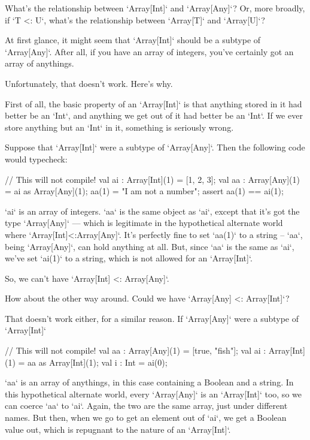 What's the relationship between \xcd`Array[Int]` and \xcd`Array[Any]`?  Or,
more broadly, if \xcd`T <: U`, what's the relationship between \xcd`Array[T]`
and \xcd`Array[U]`?

At first glance, it might seem that \xcd`Array[Int]` should be a subtype of
\xcd`Array[Any]`.  After all, if you have an array of integers, you've
certainly got an array of anythings. 

Unfortunately, that doesn't work.  Here's why. 

First of all, the basic property of an \xcd`Array[Int]` is that anything
stored in it had better be an \xcd`Int`, and anything we get out of it had
better be an \xcd`Int`.  If we ever store anything but an
\xcd`Int` in it, something is seriously wrong.  

Suppose that \xcd`Array[Int]` were a subtype of \xcd`Array[Any]`.  Then the
following code would typecheck:
\begin{xten}
// This will not compile!
val ai : Array[Int](1) = [1, 2, 3];
val aa : Array[Any](1) = ai as Array[Any](1);
aa(1) = "I am not a number";
assert aa(1) == ai(1);
\end{xten}
\xcd`ai` is an array of integers.  \xcd`aa` is the same object as \xcd`ai`,
except that it's got the type \xcd`Array[Any]` --- which is legitimate in the
hypothetical alternate world where \xcd`Array[Int]<:Array[Any]`.  
It's perfectly fine to set \xcd`aa(1)` to a string -- \xcd`aa`, being
\xcd`Array[Any]`, can hold anything at all.  But, since \xcd`aa` is the same
as \xcd`ai`, we've set \xcd`ai(1)` to a string, which is not allowed for an
\xcd`Array[Int]`. 

So, we can't have \xcd`Array[Int] <: Array[Any]`.

How about the other way around.  Could we have \xcd`Array[Any] <: Array[Int]`?  

That doesn't work either, for a similar reason.   If 
\xcd`Array[Any]` were a subtype of \xcd`Array[Int]`
\begin{xten}
// This will not compile!
val aa : Array[Any](1) = [true, "fish"];
val ai : Array[Int](1) = aa as Array[Int](1);
val i  : Int = ai(0);
\end{xten}
\xcd`aa` is an array of anythings, in this case containing a Boolean and a
string. In this hypothetical alternate world, every \xcd`Array[Any]` is an
\xcd`Array[Int]` too, so we can coerce \xcd`aa` to \xcd`ai`. Again, the two
are the same array, just under different names.  But then, when
we go to get an element out of \xcd`ai`, we get a Boolean value out, which is
repugnant to the nature of an \xcd`Array[Int]`.  

